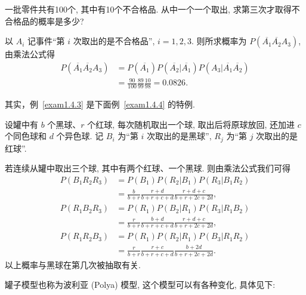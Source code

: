 \begin{example}\label{exam1.4.3}
  一批零件共有100个,
  其中有10个不合格品.
  从中一个一个取出,
  求第三次才取得不合格品的概率是多少?
\end{example}

\begin{solution}
  以 $A_i$ 记事件“第 $i$ 次取出的是不合格品”,
  $i=1,2,3$.
  则所求概率为 $P(\overline{A_1} \overline{A_2} A_3)$,
  由乘法公式得
  \begin{align*}
    P(\overline{A_1} \overline{A_2} A_3)
    &= P(\overline{A_1}) P(\overline{A_2} | \overline{A_1}) P(A_3 | \overline{A_1} \overline{A_2})\\
    &= \frac{90}{100} \frac{89}{99} \frac{10}{98} = 0.0826.
  \end{align*}
\end{solution}

其实，例~\ref{exam1.4.3} 是下面例~\ref{exam1.4.4} 的特例.

\begin{example}[罐子模型]\label{exam1.4.4}
  设罐中有 $b$ 个黑球、$r$ 个红球,
  每次随机取出一个球,
  取出后将原球放回,
  还加进 $c$ 个同色球和 $d$ 个异色球.
  记 $B_i$ 为“第 $i$ 次取出的是黑球”,
  $R_j$ 为“第 $j$ 次取出的是红球”.

  若连续从罐中取出三个球,
  其中有两个红球、一个黑球.
  则由乘法公式我们可得
  \begin{align*}
    P(B_1 R_2 R_3)
    &= P(B_1) P(R_2 | B_1) P(R_3 | B_1 R_2)\\
    &= \frac{b}{b+r} \frac{r+d}{b+r+c+d} \frac{r+d+c}{b+r+2c+2d},\\
    P(R_1 B_2 R_3)
    &= P(R_1) P(B_2 | R_1) P(R_3 | R_1 B_2)\\
    &= \frac{r}{b+r} \frac{b+d}{b+r+c+d} \frac{r+d+c}{b+r+2c+2d},\\
    P(R_1 R_2 B_3)
    &= P(R_1) P(R_2 | R_1) P(B_3 | R_1 R_2)\\
    &= \frac{r}{b+r} \frac{r+c}{b+r+c+d} \frac{b+2d}{b+r+2c+2d}.
  \end{align*}
  以上概率与黑球在第几次被抽取有关.
\end{example}

罐子模型也称为波利亚 (Polya) 模型,
这个模型可以有各种变化,
具体见下:

